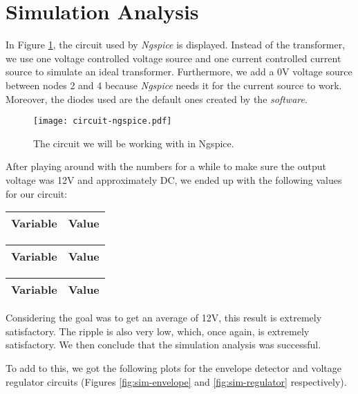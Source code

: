 \clearpage

\section{Simulation Analysis}
\label{sec:simulation}

In Figure \ref{fig:circuit-ngspice}, the circuit used by \textit{Ngspice} is displayed. Instead of the transformer, we use one voltage controlled voltage source and one current controlled current source to simulate an ideal transformer. Furthermore, we add a 0V voltage source between nodes 2 and 4 because \textit{Ngspice} needs it for the current source to work. Moreover, the diodes used are the default ones created by the \textit{software}.

\begin{figure}[h] \centering
\texttt{[image: circuit-ngspice.pdf]}
\caption{The circuit we will be working with in Ngspice.}
\label{fig:circuit-ngspice}
\end{figure}

After playing around with the numbers for a while to make sure the output voltage was 12V and approximately DC, we ended up with the following values for our circuit:

\begin{tabular}{|l|r|}
  \hline    
  {\bf Variable} & {\bf Value} \\ \hline
  
\end{tabular}

\begin{tabular}{|l|r|}
  \hline    
  {\bf Variable} & {\bf Value} \\ \hline
  
\end{tabular}

\begin{tabular}{|l|r|}
  \hline    
  {\bf Variable} & {\bf Value} \\ \hline
  
\end{tabular}

Considering the goal was to get an average of 12V, this result is extremely satisfactory. The ripple is also very low, which, once again, is extremely satisfactory. We then conclude that the simulation analysis was successful.

To add to this, we got the following plots for the envelope detector and voltage regulator circuits (Figures \ref{fig:sim-envelope} and \ref{fig:sim-regulator} respectively).


